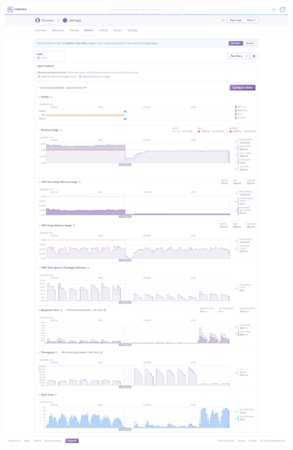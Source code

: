 \documentclass{ffhsthesis}
\begin{document}
\includegraphics[width=350pt]{anhang/screencapture-dashboard-heroku-apps-dinf-app-metrics-web-1517160269318.png}\newline
\end{document}
